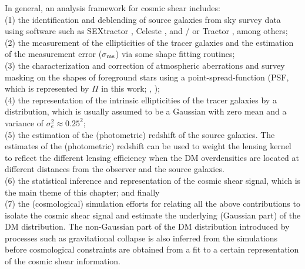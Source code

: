 In general, an analysis framework for cosmic shear includes: \\ 
(1) the identification and deblending of source galaxies from sky survey data 
using software such as {\sc SEXtractor} \citep{Bertin1996}, {\sc Celeste}
\citep{Regier2014}, and / or {\sc Tractor} \citep{Lang2010}, among others;\\
(2) the measurement of the ellipticities of the tracer galaxies  
and the estimation of the measurement error ($\sigma_{\rm
ms}$) via some shape fitting routines; \\
(3) the characterization and correction of atmospheric aberrations and survey masking 
on the shapes of foreground stars using
 a point-spread-function (PSF, which is represented by $\Pi$ in this work; \citealt{Jee2013a}, \citealt{Rowe2010}); \\
(4) the representation of the intrinsic ellipticities of the tracer galaxies by a
distribution, which is usually assumed to be a Gaussian with zero mean
and a variance of $\sigma_e^2 \approx 0.25^2$;\\ 
(5) the estimation of the (photometric) redshift of the source galaxies. The 
estimates of the (photometric) redshift can be used to weight the lensing kernel
to reflect the different lensing efficiency when the DM overdensities 
are located at different distances from the observer and the source galaxies.
\\
(6) the statistical inference and representation of the cosmic shear signal,
which is the main theme of this chapter;
and finally \\ 
(7) the (cosmological) simulation efforts for relating all the above contributions to isolate the cosmic shear signal and
estimate the underlying (Gaussian part) of the DM distribution. 
The non-Gaussian part of the DM distribution introduced by processes
such as gravitational collapse is also inferred from the simulations before    
cosmological constraints are obtained from a fit to a certain representation of
the cosmic shear information. 

